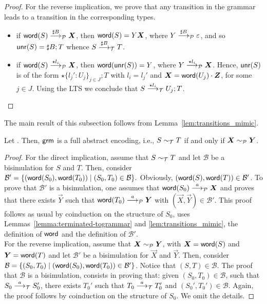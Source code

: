 \begin{proof}
	For the reverse implication, we prove that any transition in the
	grammar leads to a transition in the corresponding types.
	\begin{itemize}
		\item if $\word(S)\LTSderivesP[\sharp B] \vec X$, then
		$\word(S) = Y \vec X$, where $Y\LTSderivesP[\sharp B] \varepsilon$,
		and so $\Unravel(S) = \sharp B; T$ whence $S\LTSderives[\sharp B] T$.
		\item if $\word(S) \LTSderivesP[\star l_i] \vec X $, then
		$\word(\Unravel(S)) = Y $, where $Y\LTSderivesP[\star l_i] \vec X$.
		Hence, $\Unravel (S)$ is of the form $\star\{l_j' :U_j\}_{j\in J};T$ with $l_i = l_j'$ and
		$\vec X = \word(U_j) \cdot \vec Z$, for some $j\in J$. Using 
		the LTS we conclude that 
		$S \LTSderives[\star l_i] U_j ; T$.
	\end{itemize}
\end{proof}

The main result of this subsection follows from
Lemma~\ref{lem:transitions_mimic}.

\begin{theorem}
  \label{thm:equiv_coincide}
  Let \grmcontext. Then, $\grm$ is a full abstract encoding, i.e.,
  $S \TypeEquiv T$ if and only if $\vec X \ProdEquiv \vec Y$.
\end{theorem}

\begin{proof}
For the direct implication, assume that $S \TypeEquiv T$ and let
$\mathcal{B}$ be a bisimulation for $S$ and $T$. Then, consider 
$ \mathcal{B}' = 
\{(\word (S_0), \word(T_0))\mid (S_0,T_0)\in \mathcal{B} \}. $
Obviously, $(\word(S), \word(T))\in \mathcal{B}'$. To prove that
$\mathcal{B}'$ is a bisimulation, one assumes that 
$\word (S_0)\LTSderivesP \vec X $ and proves that there exists
$\vec Y$ such that $\word (T_0)\LTSderivesP \vec Y $
with $(\vec X, \vec Y)\in \mathcal{B}'$. This proof follows 
as usual by coinduction on the structure of $S_0$, uses 
Lemmas~\ref{lemma:terminated-togrammar}
and \ref{lem:transitions_mimic}, the definition of $\word$
and the definition of $\mathcal{B}'$. \smallskip\\
For the reverse implication, assume that 
$\vec X \ProdEquiv \vec Y$, with $\vec X = \word (S)$ and
$\vec Y = \word(T)$ and let $\mathcal{B}'$ be a bisimulation
for $\vec X$ and $\vec Y$. Then, consider
$\mathcal{B} = \{(S_0, T_0)\mid (\word(S_0),\word(T_0))\in \mathcal{B}'\}$.
Notice that $(S,T)\in \mathcal{B}$.
The proof that $\mathcal{B}$ is a bisimulation, consists in proving that:
given $(S_0, T_0)\in \mathcal{B}$, such that $S_0\LTSderives S_0'$,
there exists $T_0'$ such that $T_0\LTSderives T_0'$
and $(S_0',T_0')\in \mathcal{B}$. Again, the proof
follows by coinduction on the structure of $S_0$. 
We omit the details. 
\end{proof}


